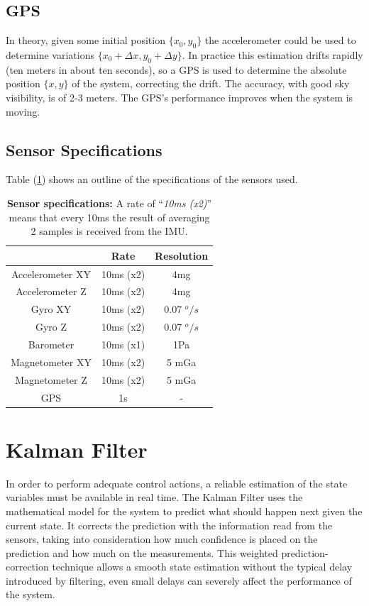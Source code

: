 \documentclass[conference]{IEEEtran}
\newcommand{\refp}[1]{(\ref{#1})}
\begin{document}
\subsection{GPS}
\label{sec:sensors-gps}
In theory, given some initial position $\{x_0 ,y_0\}$ the accelerometer could be used to determine variations $\{x_0+\Delta x,y_0+\Delta y\}$. In practice this estimation drifts rapidly (ten meters in about ten seconds), so a GPS is used to determine the absolute position $\{x,y\}$ of the system, correcting the drift. The accuracy, with good sky visibility, is of 2-3 meters. The GPS's performance improves when the system is moving.

\subsection{Sensor Specifications}
\label{sec:sensors-specifications}
Table \refp{tab:sensors:resumen} shows an outline of the specifications of the sensors used.

\begin{table}[h]
\begin{center}
\begin{tabular}{|c|c|c|}
\hline
 & Rate & Resolution \\
\hline
Accelerometer XY & 10ms (x2)& 4mg\\
\hline
Accelerometer Z  & 10ms (x2)& 4mg\\
\hline
Gyro XY  & 10ms (x2)& 0.07 $^o/s$\\
\hline
Gyro Z  & 10ms (x2)& 0.07 $^o/s$\\
\hline
Barometer  & 10ms (x1) & 1Pa\\
\hline
Magnetometer XY  & 10ms  (x2)& 5 mGa\\
\hline
Magnetometer Z  & 10ms (x2)& 5 mGa\\
\hline
GPS  & 1s & - \\
\hline
\end{tabular}
\end{center}
\caption{\textbf{Sensor specifications:} A rate of ``\textit{10ms (x2)}'' means that every 10ms the result of averaging 2 samples is received from the IMU.}
\label{tab:sensors:resumen}
\end{table}

\section{Kalman Filter}

In order to perform adequate control actions, a reliable estimation of the state variables must be available in real time. The Kalman Filter uses the mathematical model for the system to predict what should happen next given the current state. It corrects the prediction with the information read from the sensors, taking into consideration how much confidence is placed on the prediction and how much on the measurements. This weighted prediction-correction technique allows a smooth state estimation without the typical delay introduced by filtering, even small delays can severely affect the performance of the system.
\end{document}
